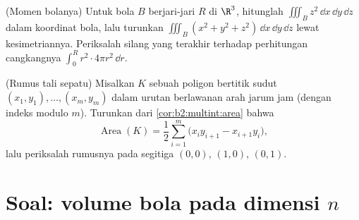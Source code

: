 \begin{exercise}[$\star\star$]\label{exo:b2:multint:11}
(Momen bolanya) Untuk bola $B$ berjari-jari $R$ di
$\R^3$, hitunglah $\iiint_B z^2\,\dd x\,\dd y\,\dd z$ dalam
koordinat bola, lalu turunkan $\iiint_B (x^2 + y^2 +
z^2)\,\dd x\,\dd y\,\dd z$ lewat kesimetriannya. Periksalah silang
yang terakhir terhadap perhitungan cangkangnya $\int_0^R r^2\cdot4\pi
r^2\,\dd r$.
\end{exercise}

\begin{exercise}[$\star\star$]\label{exo:b2:multint:12}
(Rumus tali sepatu) Misalkan $K$ sebuah poligon bertitik sudut $(x_1,
y_1), \dots, (x_m, y_m)$ dalam urutan berlawanan arah jarum jam (dengan indeks
modulo $m$). Turunkan dari \cref{cor:b2:multint:area} bahwa
\[
\operatorname{Area}(K)
= \frac12\sum_{i=1}^m
\bigl(x_iy_{i+1} - x_{i+1}y_i\bigr) ,
\]
lalu periksalah rumusnya pada segitiga $(0,0)$, $(1,0)$,
$(0,1)$.
\end{exercise}

\section{Soal: volume bola pada dimensi $n$}


